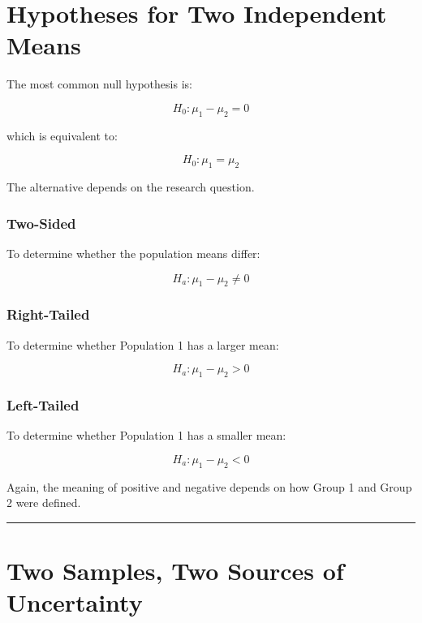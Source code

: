 \documentclass[
  letterpaper,
  DIV=11,
  numbers=noendperiod]{scrreprt}
\begin{document}

\chapter{Hypotheses for Two Independent
Means}\label{hypotheses-for-two-independent-means}

The most common null hypothesis is:

\[
H_0:\mu_1-\mu_2=0
\]

which is equivalent to:

\[
H_0:\mu_1=\mu_2
\]

The alternative depends on the research question.

\subsection{Two-Sided}\label{two-sided-1}

To determine whether the population means differ:

\[
H_a:\mu_1-\mu_2\neq0
\]

\subsection{Right-Tailed}\label{right-tailed-1}

To determine whether Population 1 has a larger mean:

\[
H_a:\mu_1-\mu_2>0
\]

\subsection{Left-Tailed}\label{left-tailed-1}

To determine whether Population 1 has a smaller mean:

\[
H_a:\mu_1-\mu_2<0
\]

Again, the meaning of positive and negative depends on how Group 1 and
Group 2 were defined.

\begin{center}\rule{0.5\linewidth}{0.5pt}\end{center}


\chapter{Two Samples, Two Sources of
Uncertainty}\label{two-samples-two-sources-of-uncertainty}
\end{document}
